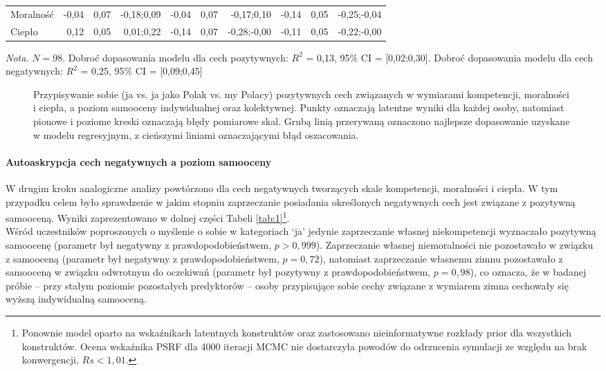 \documentclass[man]{apa6}
\begin{document}
\begin{table*}[htbp]
\begin{threeparttable}
\begin{tabular}{lrrrrrrrrr}
 Moralność   & -0,04 & 0,07 & -0,18;0,09 & -0,04 & 0,07 & -0,17;0,10 & -0,14 & 0,05 & -0,25;-0,04 \\
 Ciepło      &  0,12 & 0,05 &  0,01;0,22 & -0,14 & 0,07 & -0,28;-0,00& -0,11 & 0,05 & -0,22;-0,00 \\
\bottomrule
\end{tabular}
\egroup
\begin{tablenotes}
{\small
\textit{Nota.} $N = 98$. Dobroć dopasowania modelu dla cech pozytywnych: $R^2$ = 0,13, 95\% CI = [0,02;0,30]. Dobroć dopasowania modelu dla cech negatywnych: $R^2$ = 0,25, 95\% CI = [0,09;0,45]
}
\end{tablenotes}
\end{threeparttable}
\end{table*}


\begin{figure*}[htbp]
   \centering
   \caption{Przypisywanie sobie (ja vs. ja jako Polak vs. my Polacy) pozytywnych cech związanych w wymiarami kompetencji, moralności i ciepła, a poziom samooceny indywidualnej oraz kolektywnej. Punkty oznaczają latentne wyniki dla każdej osoby, natomiast pionowe i poziome kreski oznaczają błędy pomiarowe skal. Grubą linią przerywaną oznaczono najlepsze dopasowanie uzyskane w modelu regresyjnym, z cieńszymi liniami oznaczającymi błąd oszacowania.}
   \label{fig:1}
\end{figure*}

\paragraph{Autoaskrypcja cech negatywnych a poziom samooceny}
W drugim kroku analogiczne analizy powtórzono dla cech negatywnych tworzących skale kompetencji, moralności i ciepła. W tym przypadku celem było sprawdzenie w jakim stopniu zaprzeczanie posiadania określonych negatywnych cech jest związane z pozytywną samooceną. Wyniki zaprezentowano w dolnej części Tabeli \ref{tab:1}\footnote{Ponownie model oparto na wskaźnikach latentnych konstruktów oraz zastosowano nieinformatywne rozkłady prior dla wszystkich konstruktów. Ocena wskaźnika PSRF dla 4000 iteracji MCMC nie dostarczyła powodów do odrzucenia symulacji ze względu na brak konwergencji, $Rs < 1,01$.}. \\

Wśród uczestników poproszonych o myślenie o sobie w kategoriach `ja' jedynie zaprzeczanie własnej niekompetencji wyznaczało pozytywną samoocenę (parametr był negatywny z prawdopodobieństwem, $p > 0,999$). Zaprzeczanie własnej niemoralności nie pozostawało w związku z samooceną (parametr był negatywny z prawdopodobieństwem, $p = 0,72$), natomiast zaprzeczanie własnemu zimnu pozostawało z samooceną w związku odwrotnym do oczekiwań (parametr był pozytywny z prawdopodobieństwem, $p = 0,98$), co oznacza, że w badanej próbie -- przy stałym poziomie pozostałych predyktorów -- osoby przypisujące sobie cechy związane z wymiarem zimna cechowały się wyższą indywidualną samooceną.\\
\end{document}
